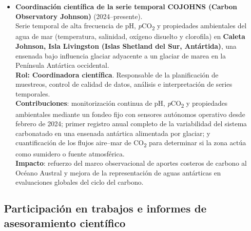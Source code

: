 \documentclass[11pt,a4paper]{article}
\begin{document}
\begin{itemize}[leftmargin=*]
    \item \textbf{Coordinación científica de la serie temporal COJOHNS (Carbon Observatory Johnson)} (2024--presente).\\
    Serie temporal de alta frecuencia de pH, \textit{p}CO\textsubscript{2} y propiedades ambientales del agua de mar (temperatura, salinidad, oxígeno disuelto y clorofila) en \textbf{Caleta Johnson, Isla Livingston (Islas Shetland del Sur, Antártida)}, una ensenada bajo influencia glaciar adyacente a un glaciar de marea en la Península Antártica occidental.\\
    \textbf{Rol: Coordinadora científica}. Responsable de la planificación de muestreos, control de calidad de datos, análisis e interpretación de series temporales.\\
    \textbf{Contribuciones}: monitorización continua de pH, \textit{p}CO\textsubscript{2} y propiedades ambientales mediante un fondeo fijo con sensores autónomos operativo desde febrero de 2024; primer registro anual completo de la variabilidad del sistema carbonatado en una ensenada antártica alimentada por glaciar; y cuantificación de los flujos aire--mar de CO\textsubscript{2} para determinar si la zona actúa como sumidero o fuente atmosférica.\\
    \textbf{Impacto}: refuerzo del marco observacional de aportes costeros de carbono al Océano Austral y mejora de la representación de aguas antárticas en evaluaciones globales del ciclo del carbono.

\end{itemize}



\subsection{Participación en trabajos e informes de asesoramiento científico}
\end{document}
